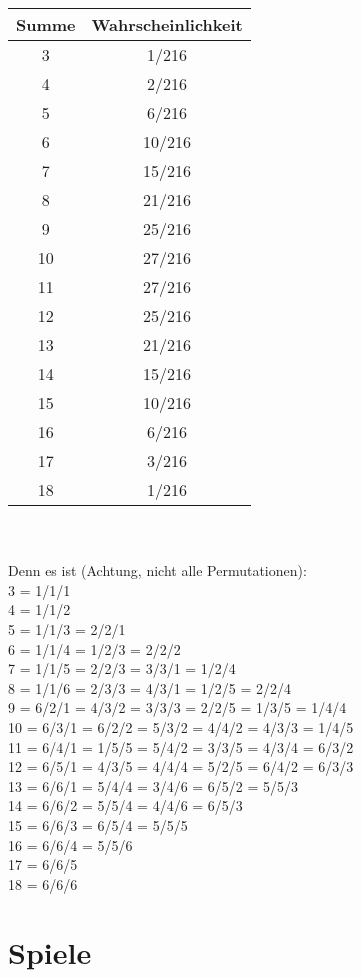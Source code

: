 \documentclass{article}
\begin{document}
\begin{tabular}{c | c}
Summe & Wahrscheinlichkeit \\
\hline
3 & 1/216\\
4 & 2/216\\
5 & 6/216\\
6 & 10/216\\
7 & 15/216\\
8 & 21/216\\
9 & 25/216\\
10 & 27/216\\
11 & 27/216\\
12 & 25/216\\
13 & 21/216\\
14 & 15/216\\
15 & 10/216\\
16 & 6/216\\
17 & 3/216\\
18 & 1/216\\
\end{tabular}
 \\\\
Denn es ist (Achtung, nicht alle Permutationen):\\
3 = 1/1/1\\
4 = 1/1/2\\
5 = 1/1/3 = 2/2/1\\
6 = 1/1/4 = 1/2/3 = 2/2/2\\
7 = 1/1/5 = 2/2/3 = 3/3/1 = 1/2/4\\
8 = 1/1/6 = 2/3/3 = 4/3/1 = 1/2/5 = 2/2/4\\
9 = 6/2/1 = 4/3/2 = 3/3/3 = 2/2/5 = 1/3/5 = 1/4/4\\
10 = 6/3/1 = 6/2/2 = 5/3/2 = 4/4/2 = 4/3/3 = 1/4/5\\
11 = 6/4/1 = 1/5/5 = 5/4/2 = 3/3/5 = 4/3/4 = 6/3/2\\
12 = 6/5/1 = 4/3/5 = 4/4/4 = 5/2/5 = 6/4/2 = 6/3/3\\
13 = 6/6/1 = 5/4/4 = 3/4/6 = 6/5/2 = 5/5/3\\
14 = 6/6/2 = 5/5/4 = 4/4/6 = 6/5/3\\
15 = 6/6/3 = 6/5/4 = 5/5/5\\
16 = 6/6/4 = 5/5/6\\
17 = 6/6/5\\
18 = 6/6/6
\pagebreak

\section{Spiele}
\end{document}
